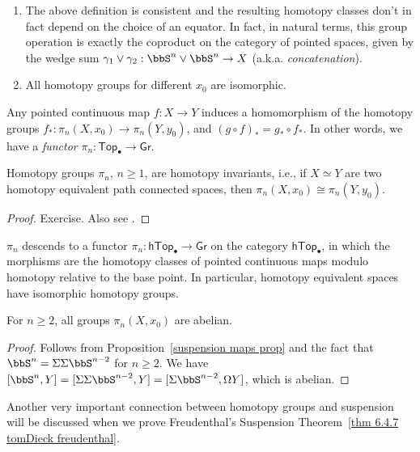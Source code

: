 \begin{xca}
\begin{enumerate}
    \item The above definition is consistent and the resulting homotopy classes don't in fact depend on the choice of an equator. In fact, in natural terms, this group operation is exactly the coproduct on the category of pointed spaces, given by the wedge sum $\gamma_1\lor\gamma_2:\bbS^n\lor \bbS^n\to X$ (a.k.a. \emph{concatenation}).
    \item All homotopy groups for different $x_0$ are isomorphic.
\end{enumerate}
\end{xca}


\begin{prop}[Functoriality of $\pi_n$]
    Any pointed continuous map $f:X\to Y$ induces a homomorphism of the homotopy groups $f_\ast:\pi_n(X,x_0)\to \pi_n(Y,y_0)$, and $(g\circ f)_\ast=g_\ast\circ f_\ast$. In other words, we have a \emph{functor} $\pi_n:\mathsf{Top}_\bullet\to \mathsf{Gr}$.
\end{prop}

\begin{thm}
Homotopy groups $\pi_n$, $n\geq 1$, are homotopy invariants, i.e., if $X\simeq Y$ are two homotopy equivalent path connected spaces, then $\pi_n(X,x_0)\cong\pi_n(Y,y_0)$.
\end{thm}
\begin{proof}
Exercise. Also see \cite{Hatcher}.
\end{proof}
\begin{cor}
    $\pi_n$ descends to a functor $\pi_n:\mathsf{hTop}_\bullet\to \mathsf{Gr}$ on the category $\mathsf{hTop}_\bullet$, in which the morphisms are the homotopy classes of pointed continuous maps modulo homotopy relative to the base point. In particular, homotopy equivalent spaces have isomorphic homotopy groups.
\end{cor}

\begin{thm}
For $n\geq 2$, all groups $\pi_n(X,x_0)$ are abelian.
\end{thm}
\begin{proof}
Follows from Proposition~\ref{suspension maps prop} and the fact that $\bbS^n=\Sigma\Sigma \bbS^{n-2}$ for $n\geq 2$. We have $[\bbS^n,Y]=[\Sigma\Sigma \bbS^{n-2},Y]=[\Sigma \bbS^{n-2}, \Omega Y]$, which is abelian.
\end{proof}

Another very important connection between homotopy groups and suspension will be discussed when we prove Freudenthal's Suspension Theorem~\ref{thm 6.4.7 tomDieck freudenthal}.

